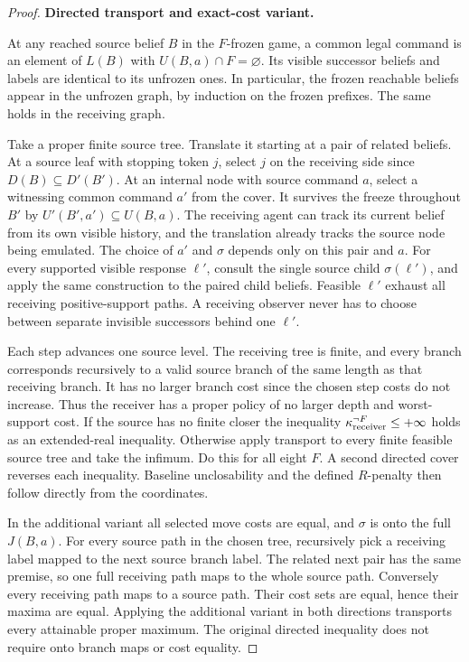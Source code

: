 \begin{proof}
\textbf{Directed transport and exact-cost variant.}

At any reached source belief \(B\) in the \(F\)-frozen game, a common legal command is an element of \(L(B)\) with \(U(B,a)\cap F=\varnothing\). Its visible successor beliefs and labels are identical to its unfrozen ones. In particular, the frozen reachable beliefs appear in the unfrozen graph, by induction on the frozen prefixes. The same holds in the receiving graph.

Take a proper finite source tree. Translate it starting at a pair of related beliefs. At a source leaf with stopping token \(j\), select \(j\) on the receiving side since \(D(B)\subseteq D'(B')\). At an internal node with source command \(a\), select a witnessing common command \(a'\) from the cover. It survives the freeze throughout \(B'\) by \(U'(B',a')\subseteq U(B,a)\). The receiving agent can track its current belief from its own visible history, and the translation already tracks the source node being emulated. The choice of \(a'\) and \(\sigma\) depends only on this pair and \(a\). For every supported visible response \(\ell'\), consult the single source child \(\sigma(\ell')\), and apply the same construction to the paired child beliefs. Feasible \(\ell'\) exhaust all receiving positive-support paths. A receiving observer never has to choose between separate invisible successors behind one \(\ell'\).

Each step advances one source level. The receiving tree is finite, and every branch corresponds recursively to a valid source branch of the same length as that receiving branch. It has no larger branch cost since the chosen step costs do not increase. Thus the receiver has a proper policy of no larger depth and worst-support cost. If the source has no finite closer the inequality \(\kappa^{\neg F}_{\rm receiver}\le+\infty\) holds as an extended-real inequality. Otherwise apply transport to every finite feasible source tree and take the infimum. Do this for all eight \(F\). A second directed cover reverses each inequality. Baseline unclosability and the defined \(R\)-penalty then follow directly from the coordinates.

In the additional variant all selected move costs are equal, and \(\sigma\) is onto the full \(J(B,a)\). For every source path in the chosen tree, recursively pick a receiving label mapped to the next source branch label. The related next pair has the same premise, so one full receiving path maps to the whole source path. Conversely every receiving path maps to a source path. Their cost sets are equal, hence their maxima are equal. Applying the additional variant in both directions transports every attainable proper maximum. The original directed inequality does not require onto branch maps or cost equality.


\end{proof}
